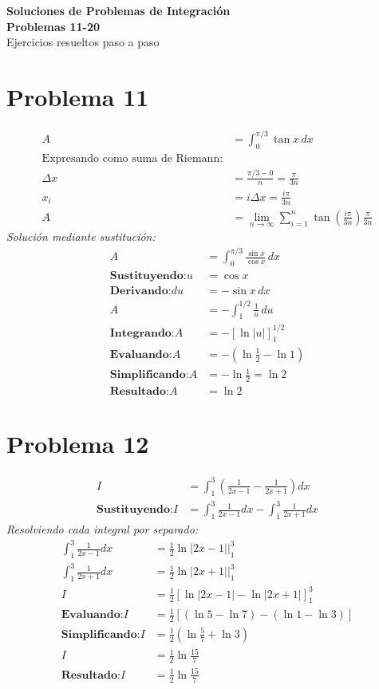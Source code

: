 \documentclass[12pt]{article}
\newcommand{\problema}[1]{\section*{Problema #1}}
\newcommand{\sustituyendo}{\textbf{Sustituyendo:} }
\newcommand{\derivando}{\textbf{Derivando:} }
\newcommand{\integrando}{\textbf{Integrando:} }
\newcommand{\evaluando}{\textbf{Evaluando:} }
\newcommand{\simplificando}{\textbf{Simplificando:} }
\newcommand{\obteniendo}{\textbf{Resultado:} }
\begin{document}
	
	\begin{center}
		\LARGE\textbf{Soluciones de Problemas de Integración} \\
		\large\textbf{Problemas 11-20} \\
		\vspace{0.5cm}
		\normalsize Ejercicios resueltos paso a paso
	\end{center}
	
	\vspace{1cm}
	
	\problema{11}
	\begin{align*}
		A &= \int_{0}^{\pi/3} \tan x \, dx \\
		\text{Expresando como suma de Riemann:} & \\
		\Delta x &= \frac{\pi/3 - 0}{n} = \frac{\pi}{3n} \\
		x_i &= i\Delta x = \frac{i\pi}{3n} \\
		A &= \lim_{n \to \infty} \sum_{i=1}^{n} \tan\left(\frac{i\pi}{3n}\right) \frac{\pi}{3n}
	\end{align*}
	\textit{Solución mediante sustitución:}
	\begin{align*}
		A &= \int_{0}^{\pi/3} \frac{\sin x}{\cos x} \, dx \\
		\sustituyendo u &= \cos x \\
		\derivando du &= -\sin x \, dx \\
		A &= -\int_{1}^{1/2} \frac{1}{u} \, du \\
		\integrando A &= -\left[\ln|u|\right]_{1}^{1/2} \\
		\evaluando A &= -\left(\ln\frac{1}{2} - \ln 1\right) \\
		\simplificando A &= -\ln\frac{1}{2} = \ln 2 \\
		\obteniendo A &= \boxed{\ln 2}
	\end{align*}
	
	\vspace{0.5cm}
	
	\problema{12}
	\begin{align*}
		I &= \int_{1}^{3} \left( \frac{1}{2x - 1} - \frac{1}{2x + 1} \right) dx \\
		\sustituyendo 
		I &= \int_{1}^{3} \frac{1}{2x - 1} dx - \int_{1}^{3} \frac{1}{2x + 1} dx
	\end{align*}
	\textit{Resolviendo cada integral por separado:}
	\begin{align*}
		\int_{1}^{3} \frac{1}{2x - 1} dx &= \frac{1}{2} \ln|2x - 1| \Big|_{1}^{3} \\
		\int_{1}^{3} \frac{1}{2x + 1} dx &= \frac{1}{2} \ln|2x + 1| \Big|_{1}^{3} \\
		I &= \frac{1}{2} \left[ \ln|2x - 1| - \ln|2x + 1| \right]_{1}^{3} \\
		\evaluando I &= \frac{1}{2} \left[ (\ln 5 - \ln 7) - (\ln 1 - \ln 3) \right] \\
		\simplificando I &= \frac{1}{2} \left( \ln \frac{5}{7} + \ln 3 \right) \\
		I &= \frac{1}{2} \ln \frac{15}{7} \\
		\obteniendo I &= \boxed{\frac{1}{2} \ln \frac{15}{7}}
	\end{align*}
	
\end{document}
